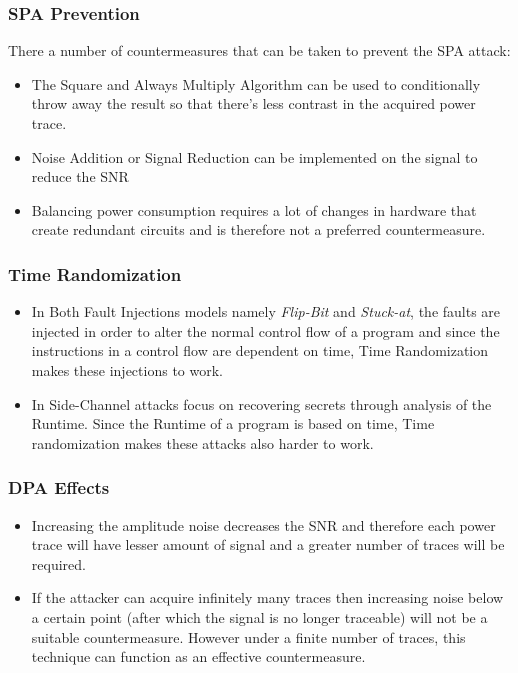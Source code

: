 \documentclass[1p,16pt]{elsarticle}
\begin{document}
\subsubsection{SPA Prevention}%
\label{sub:spa_prevention}
There a number of countermeasures that can be taken to prevent the SPA attack:
\begin{itemize}
	\item The Square and Always Multiply Algorithm can be used to conditionally throw away the result
		so that there's less contrast in the acquired power trace.
	\item Noise Addition or Signal Reduction can be implemented on the signal to reduce the SNR
	\item Balancing power consumption requires a lot of changes in hardware that create redundant circuits
		and is therefore not a preferred countermeasure.
\end{itemize}

\subsubsection{Time Randomization}%
\label{ssub:time_randomization}
\begin{itemize}
	\item In Both Fault Injections models namely \textit{Flip-Bit} and \textit{Stuck-at},
		the faults are injected in order to alter the normal control flow of a program
		and since the instructions in a control flow are dependent on time, Time Randomization
		makes these injections to work.
	\item In Side-Channel attacks focus on recovering secrets through analysis of the Runtime.
		Since the Runtime of a program is based on time, Time randomization makes these attacks
		also harder to work.
\end{itemize}

\subsubsection{DPA Effects}%
\label{ssub:dpa_effects}
\begin{itemize}
	\item Increasing the amplitude noise decreases the SNR and therefore each power trace
		will have lesser amount of signal and a greater number of traces will be required.
	\item If the attacker can acquire infinitely many traces then increasing noise below a certain
		point (after which the signal is no longer traceable)
		will not be a suitable countermeasure. However under a finite number of traces,
		this technique can function as an effective countermeasure.
\end{itemize}
\end{document}
